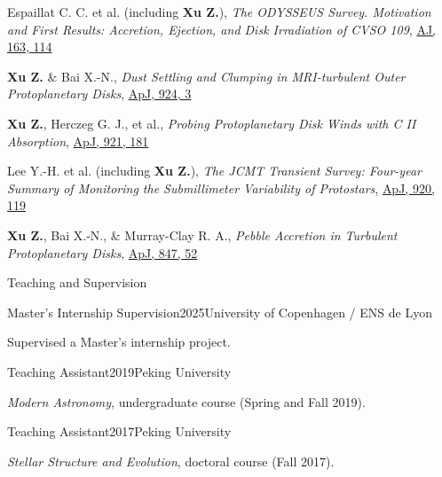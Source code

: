 \documentclass{resume} %
\begin{document}
\begin{rSectionLink}
\begin{list}{}
\item[2022] Espaillat C. C. et al. (including \textbf{Xu Z.}), \emph{The ODYSSEUS Survey. Motivation and First Results: Accretion, Ejection, and Disk Irradiation of CVSO 109}, \href{https://ui.adsabs.harvard.edu/abs/2022AJ....163..114E/abstract}{AJ, 163, 114}

\item[2022] \textbf{Xu Z.} \& Bai X.-N., \emph{Dust Settling and Clumping in MRI-turbulent Outer Protoplanetary Disks}, \href{https://ui.adsabs.harvard.edu/abs/2022ApJ...924....3X/abstract}{ApJ, 924, 3}

\item[2021] \textbf{Xu Z.}, Herczeg G. J., et al., \emph{Probing Protoplanetary Disk Winds with C II Absorption}, \href{https://ui.adsabs.harvard.edu/abs/2021ApJ...921..181X/abstract}{ApJ, 921, 181}

\item[2021] Lee Y.-H. et al. (including \textbf{Xu Z.}), \emph{The JCMT Transient Survey: Four-year Summary of Monitoring the Submillimeter Variability of Protostars}, \href{https://ui.adsabs.harvard.edu/abs/2021ApJ...920..119L/abstract}{ApJ, 920, 119}

\item[2017] \textbf{Xu Z.}, Bai X.-N., \& Murray-Clay R. A., \emph{Pebble Accretion in Turbulent Protoplanetary Disks}, \href{https://ui.adsabs.harvard.edu/abs/2017ApJ...847...52X/abstract}{ApJ, 847, 52}
\end{list}
\end{rSectionLink}

\begin{rSection}{Teaching and Supervision}
\begin{rSubsection}{Master's Internship Supervision}{2025}{University of Copenhagen / ENS de Lyon}{}
\item Supervised a Master's internship project.
\end{rSubsection}
\begin{rSubsection}{Teaching Assistant}{2019}{Peking University}{}
\item \emph{Modern Astronomy}, undergraduate course (Spring and Fall 2019).
\end{rSubsection}
\begin{rSubsection}{Teaching Assistant}{2017}{Peking University}{}
\item \emph{Stellar Structure and Evolution}, doctoral course (Fall 2017).
\end{rSubsection}
\end{rSection}
\end{document}
